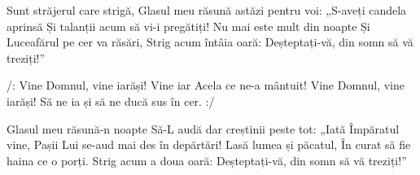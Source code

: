 \beginverse
Sunt străjerul care strigă,
Glasul meu răsună astăzi pentru voi:
„S-aveți candela aprinsă
Și talanții acum să vi-i pregătiți!
Nu mai este mult din noapte
Și Luceafărul pe cer va răsări,
Strig acum întâia oară:
Deșteptați-vă, din somn să vă treziți!”
\endverse

\beginchorus
/: Vine Domnul, vine iarăși!
Vine iar Acela ce ne-a mântuit!
Vine Domnul, vine iarăși!
Să ne ia și să ne ducă sus în cer. :/
\endchorus

\beginverse
Glasul meu răsună-n noapte
Să-L audă dar creștinii peste tot:
„Iată Împăratul vine,
Pașii Lui se-aud mai des în depărtări!
Lasă lumea și păcatul,
În curat să fie haina ce o porți.
Strig acum a doua oară:
Deșteptați-vă, din somn să vă treziți!”
\endverse
\endsong